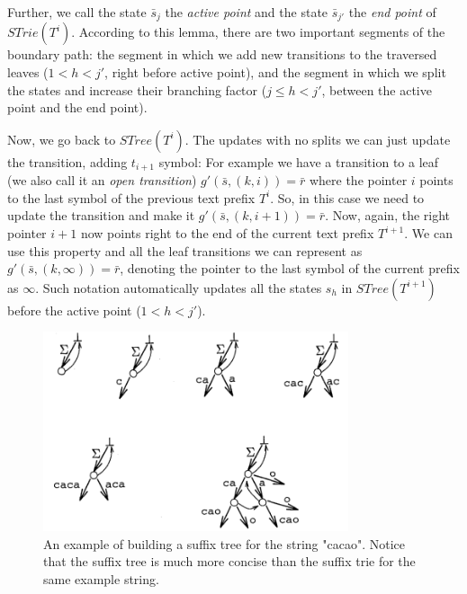 \documentclass[paper=a4, fontsize=11pt]{scrartcl} %
\numberwithin{equation}{section} %
\numberwithin{figure}{section} %
\numberwithin{table}{section} %
\begin{document}
\par Further, we call the state $\bar{s}_j$ the \textit{active point} and the state $\bar{s}_{j'}$ the \textit{end point} of $STrie(T^i)$. According to this lemma, there are two important segments of the boundary path: the segment in which we add new transitions to the traversed leaves ($1 < h < j'$, right before active point), and the segment in which we split the states and increase their branching factor ($j \le h < j'$, between the active point and the end point).

\par Now, we go back to $STree(T^i)$. The updates with no splits we can just update the transition, adding $t_{i+1}$ symbol: For example we have a transition to a leaf (we also call it an \textit{open transition}) $g'(\bar{s}, (k, i)) = \bar{r}$ where the pointer $i$ points to the last symbol of the previous text prefix $T^i$. So, in this case we need to update the transition and make it $g'(\bar{s}, (k, i+1)) = \bar{r}$. Now, again, the right pointer $i+1$ now points right to the end of the current text prefix $T^{i+1}$. We can use this property and all the leaf transitions we can represent as $g'(\bar{s}, (k, \infty)) = \bar{r}$, denoting the pointer to the last symbol of the current prefix as $\infty$. Such notation automatically updates all the states $s_h$ in $STree(T^{i+1})$ before the active point ($1 < h < j'$).

\begin{figure}[h!]
\centering
\includegraphics[width=0.8\textwidth]{figures/suffix-tree-eg.png}
\caption{An example of building a suffix tree for the string "cacao". Notice that the suffix tree is much more concise than the suffix trie for the same example string.}
\label{fig:siffix-tree}
\end{figure}
\end{document}
